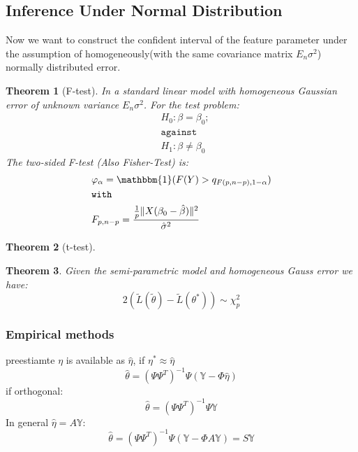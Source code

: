 \documentclass[a4paper,12pt, oneside, fleqn]{book}
\newtheorem{theorem}{Theorem}[section]
\theoremstyle{definition}
\theoremstyle{remark}
\begin{document}
\subsection{Inference Under Normal Distribution}
Now we want to construct the confident interval of the feature parameter under the assumption of homogeneously(with the same covariance matrix $E_n \sigma^2$) normally distributed error.

\begin{theorem}[F-test]
In a standard linear model with homogeneous Gaussian error of unknown variance $E_n \sigma^2$. For the test problem:
\begin{align*}
    & H_0: \beta = \beta_0;\\
    & \texttt{against}\\
    & H_1: \beta \neq \beta_0
\end{align*}
The two-sided F-test (Also Fisher-Test) is: 
\begin{align*}
    &\varphi_\alpha = \mathbbm{1}(F(Y) > q_{F(p, n - p), 1-\alpha})\\
    &\texttt{with}\\
    & F_{p, n - p} = \frac{\frac{1}{p} \|X( \beta_0 - \hat{\beta} )\|^2}{\hat{\sigma}^2}
\end{align*}
\end{theorem}

\begin{theorem}[t-test]
\end{theorem}

\begin{theorem}
	Given the semi-parametric model  and homogeneous Gauss error we have:
	\begin{equation*}
		2(\tilde{L}(\tilde{\theta}) - \tilde{L}(\theta^*)) \sim \chi^2_p
	\end{equation*}
\end{theorem}


\subsubsection*{Empirical methods}
preestiamte $\eta$ is available as $\hat{\eta}$, if $\eta^* \approx \hat{\eta}$
\begin{equation*}
	\hat{\theta} = (\Psi \Psi^T)^{-1} \Psi(\mathbb{Y} - \Phi \hat{\eta})
\end{equation*}
if orthogonal:
\begin{equation*}
	\hat{\theta} = (\Psi \Psi^T)^{-1} \Psi\mathbb{Y}
\end{equation*}
In general $\hat{\eta} = A\mathbb{Y}$:
\begin{equation*}
	\hat{\theta} = (\Psi\Psi^T)^{-1} \Psi(\mathbb{Y} - \Phi A \mathbb{Y}) = S\mathbb{Y}
\end{equation*}
\end{document}
